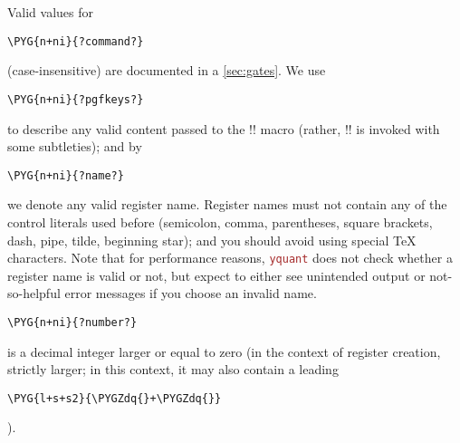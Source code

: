\documentclass{scrartcl}
\def\pkg#1{\textcolor{brown}{\texttt{#1}}}
\def\Yquant{\pkg{yquant}}
\begin{document}
         Valid values for
         \begin{BVerbatim}[commandchars=\\\{\}]
\PYG{n+ni}{?command?}
         \end{BVerbatim}
         \space (case\hyp insensitive) are documented in a \cref{sec:gates}.
         We use
         \begin{BVerbatim}[commandchars=\\\{\}]
\PYG{n+ni}{?pgfkeys?}
         \end{BVerbatim}
         \space to describe any valid content passed to the \tex!\pgfkeys! macro (rather, \tex!\yquantset! is invoked with some subtleties); and by
         \begin{BVerbatim}[commandchars=\\\{\}]
\PYG{n+ni}{?name?}
         \end{BVerbatim}
         \space we denote any valid register name.
         Register names must not contain any of the control literals used before (semicolon, comma, parentheses, square brackets, dash, pipe, tilde, beginning star); and you should avoid using special \TeX{} characters.
         Note that for performance reasons, \Yquant{} does not check whether a register name is valid or not, but expect to either see unintended output or not\hyp so\hyp helpful error messages if you choose an invalid name.
         \begin{BVerbatim}[commandchars=\\\{\}]
\PYG{n+ni}{?number?}
         \end{BVerbatim}
         \space is a decimal integer larger or equal to zero (in the context of register creation, strictly larger; in this context, it may also contain a leading
         \begin{BVerbatim}[commandchars=\\\{\}]
\PYG{l+s+s2}{\PYGZdq{}+\PYGZdq{}}
         \end{BVerbatim}
         ).
\end{document}
